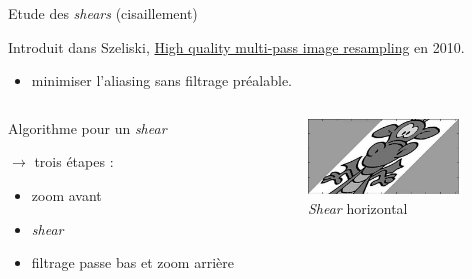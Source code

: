 \documentclass[c,12pt]{beamer}
\newcommand{\ra}[0]{\rightarrow}
\begin{document}
\begin{frame}{Etude des \emph{shears} (cisaillement)}

Introduit dans Szeliski, \underline{High quality multi-pass image resampling} en 2010. %

\begin{itemize}
\item minimiser l'aliasing sans filtrage préalable.
\end{itemize}

\begin{columns}
\begin{column}{5cm}

\begin{block}{Algorithme pour un \emph{shear}}

$\ra$ trois étapes :

\begin{itemize}
\item zoom avant
\item \emph{shear}
\item filtrage passe bas et zoom arrière
\end{itemize}

\end{block}
  
 \end{column}

\begin{column}{5cm}

\begin{figure}
\centering
\includegraphics[width=4cm]{dragonshear.jpg}
\caption{\emph{Shear} horizontal}
\end{figure}

\end{column}
\end{columns}
\end{frame}
\end{document}
